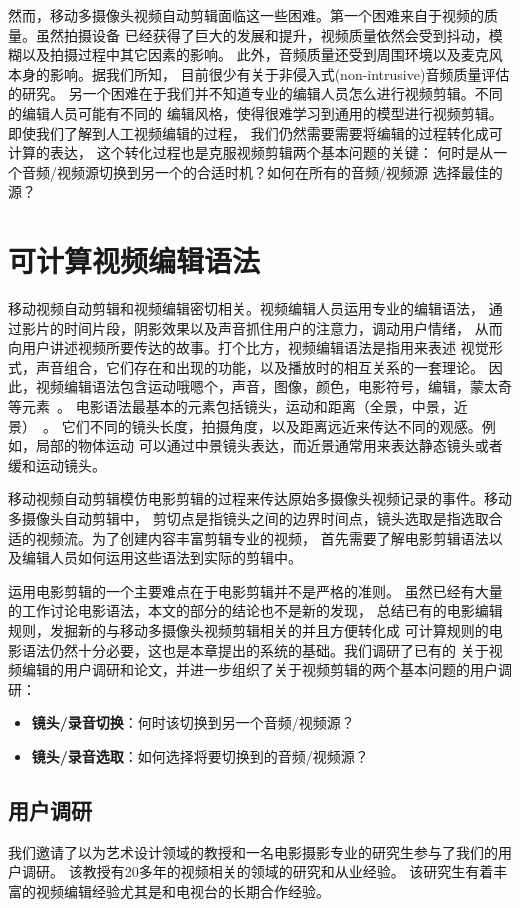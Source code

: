 然而，移动多摄像头视频自动剪辑面临这一些困难。第一个困难来自于视频的质量。虽然拍摄设备
已经获得了巨大的发展和提升，视频质量依然会受到抖动，模糊以及拍摄过程中其它因素的影响。
此外，音频质量还受到周围环境以及麦克风本身的影响。据我们所知，
目前很少有关于非侵入式(non-intrusive)音频质量评估的研究。
另一个困难在于我们并不知道专业的编辑人员怎么进行视频剪辑。不同的编辑人员可能有不同的
编辑风格，使得很难学习到通用的模型进行视频剪辑。即使我们了解到人工视频编辑的过程，
我们仍然需要需要将编辑的过程转化成可计算的表达，
这个转化过程也是克服视频剪辑两个基本问题的关键：
何时是从一个音频/视频源切换到另一个的合适时机？如何在所有的音频/视频源
选择最佳的源？

\section{可计算视频编辑语法}
移动视频自动剪辑和视频编辑密切相关。视频编辑人员运用专业的编辑语法，
通过影片的时间片段，阴影效果以及声音抓住用户的注意力，调动用户情绪，
从而向用户讲述视频所要传达的故事。打个比方，视频编辑语法是指用来表述
视觉形式，声音组合，它们存在和出现的功能，以及播放时的相互关系的一套理论。
因此，视频编辑语法包含运动哦嗯个，声音，图像，颜色，电影符号，编辑，蒙太奇等元素~\cite{manchel1990film}。
电影语法最基本的元素包括镜头，运动和距离（全景，中景，近景）~\cite{CinemaElements1982}。
它们不同的镜头长度，拍摄角度，以及距离远近来传达不同的观感。例如，局部的物体运动
可以通过中景镜头表达，而近景通常用来表达静态镜头或者缓和运动镜头。

移动视频自动剪辑模仿电影剪辑的过程来传达原始多摄像头视频记录的事件。移动多摄像头自动剪辑中，
剪切点是指镜头之间的边界时间点，镜头选取是指选取合适的视频流。为了创建内容丰富剪辑专业的视频，
首先需要了解电影剪辑语法以及编辑人员如何运用这些语法到实际的剪辑中。

运用电影剪辑的一个主要难点在于电影剪辑并不是严格的准则。
虽然已经有大量的工作讨论电影语法，本文的部分的结论也不是新的发现，
总结已有的电影编辑规则，发掘新的与移动多摄像头视频剪辑相关的并且方便转化成
可计算规则的电影语法仍然十分必要，这也是本章提出的系统的基础。我们调研了已有的
关于视频编辑的用户调研和论文，并进一步组织了关于视频剪辑的两个基本问题的用户调研：
\begin{itemize}
    \item \textbf{镜头/录音切换}：何时该切换到另一个音频/视频源？
    \item \textbf{镜头/录音选取}：如何选择将要切换到的音频/视频源？
\end{itemize}

\subsection{用户调研}
我们邀请了以为艺术设计领域的教授和一名电影摄影专业的研究生参与了我们的用户调研。
该教授有20多年的视频相关的领域的研究和从业经验。
该研究生有着丰富的视频编辑经验尤其是和电视台的长期合作经验。

